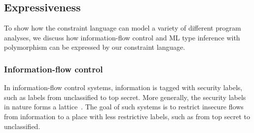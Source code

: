 \subsection{Expressiveness}


To show how the constraint language can model a variety of different
program analyses, we discuss how information-flow control and ML type
inference with polymorphism can be expressed by our constraint
language.

\subsubsection{Information-flow control}


% 
% 
% 
% 

In information-flow control systems, information is tagged with security
labels, such as labels from unclassified to top secret. More generally, the
security labels in nature forms a lattice~\cite{denning-lattice}. The goal of
such systems is to restrict insecure flows from information to a place with
less restrictive labels, such as from top secret to unclassified. 

